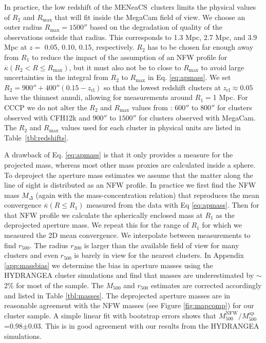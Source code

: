 \documentclass[useAMS,usenatbib]{mnras}
\newcommand{\mn}{MENeaCS}
\begin{document}
In practice, the low redshift of the \mn \ clusters limits the physical values of $R_2$ and $R_\mathrm{max}$ that will fit inside the MegaCam field of view. We choose an outer radius $R_\mathrm{max}=1500''$ based on the degradation of quality of the observations outside that radius. This corresponds to 1.3 Mpc, 2.7 Mpc, and 3.9 Mpc at $z=$ 0.05, 0.10, 0.15, respectively. $R_2$ has to be chosen far enough away from $R_1$ to reduce the impact of the assumption of an NFW profile for $\overline{\kappa}(R_2 < R \leq R_\mathrm{max}) $, but it must also not be to close to $R_\mathrm{max}$ to avoid large uncertainties in the integral from $R_2$ to $R_\mathrm{max}$ in Eq. \ref{eq:apmass}. We set \mbox{$R_2 = 900''+400''(0.15-z_\mathrm{cl})$} so that the lowest redshift clusters at $z_\mathrm{cl} \approx 0.05$ have the thinnest annuli, allowing for measurements around $R_1=$1 Mpc. For CCCP we do not alter the $R_2$ and $R_\mathrm{max}$ values from : $600''$ to $800''$ for clusters observed with CFH12k and $900''$ to $1500''$ for clusters observed with MegaCam. The $R_2$ and $R_\mathrm{max}$ values used for each cluster in physical units are listed in Table~\ref{tbl:redshifts}.



A drawback of Eq. \ref{eq:apmass} is that it only provides a measure for the projected mass, whereas most other mass proxies are calculated inside a sphere. To deproject the aperture mass estimates we assume that the matter along the line of sight is distributed as an NFW profile. 
In practice we first find the NFW mass $M_\Delta$ (again with the \citealt{duttonmaccio14} mass-concentration relation) that reproduces the mean convergence $\overline{\kappa}(R \leq R_1)$ measured from the data with Eq \ref{eq:apmass}. Then for that NFW profile we calculate the spherically enclosed mass at $R_1$ as the deprojected aperture mass. We repeat this for the range of $R_1$ for which we measured the 2D mean convergence. We interpolate between measurements to find $r_{500}$. The radius $r_{200}$ is larger than the available field of view for many clusters and even $r_{500}$ is barely in view for the nearest clusters. 
 In Appendix \ref{app:massbias} we determine the bias in aperture masses using the HYDRANGEA cluster simulations and find that masses are underestimated by $\sim$2\% for most of the sample. The $M_{500}$ and $r_{500}$ estimates are corrected accordingly and listed in Table \ref{tbl:masses}.
The deprojected aperture masses are in reasonable agreement with the NFW masses (see Figure \ref{fig:mapcomp}) for our cluster sample. A simple linear fit with bootstrap errors shows that $M^\mathrm{NFW}_{500} / M^\mathrm{ap}_{500}$=0.98$\pm$0.03. This is in good agreement with our results from the HYDRANGEA simulations.
\end{document}
